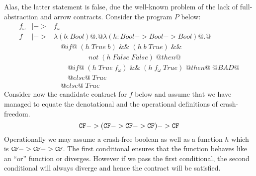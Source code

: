 


Alas, the latter statement is false, due the well-known problem of the lack of full-abstraction and arrow
contracts. Consider the program $P$ below:
\[\begin{array}{lcl}
f_\omega & |-> & f_\omega \\
f & |-> & \lambda (b{:}Bool) @.@ \lambda (h{:}Bool->Bool->Bool) @.@ \\
  &     & \quad @if@\;(h\;True\;b)\;\&\&\;(h\;b\;True)\;\&\& \\ 
  &     & \quad\qquad\qquad not\;(h\;False\;False)\;@then@ \\
  &     & \quad\quad @if@\;(h\;True\;f_\omega)\;\&\&\;(h\;f_\omega\;True)\;@then@\;@BAD@ \\
  &     & \quad\quad @else@\;True \\
  &     & \quad @else@\;True
\end{array}\]
Consider now the candidate contract for $f$ below and assume that we have managed to equate the 
denotational and the operational definitions of crash-freedom.
\[ {\tt CF} -> ({\tt CF} -> {\tt CF} -> {\tt CF}) -> {\tt CF} \]
Operationally we may assume a crash-free boolean as well as a function $h$ which is 
${\tt CF} -> {\tt CF} -> {\tt CF}$. The first conditional ensures that the function behaves like an ``or'' function or 
diverges. However if we pass the first conditional, 
the second conditional will always diverge and hence the contract will be satisfied. 


